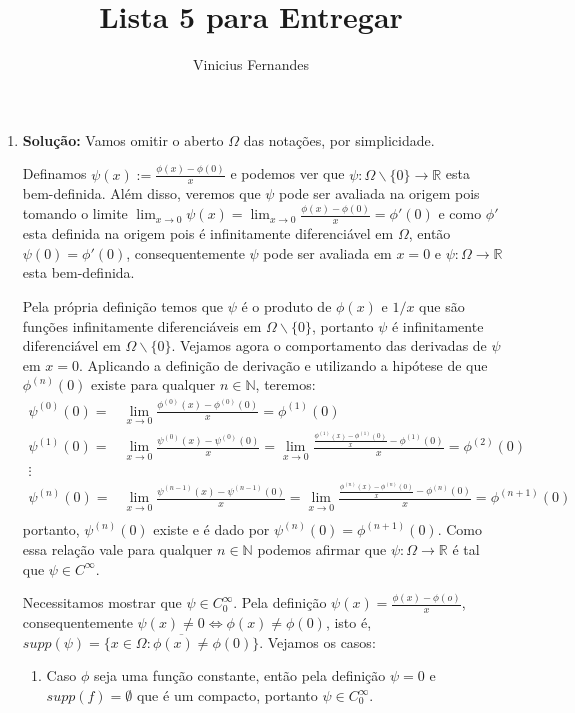 \documentclass{article}
\begin{document}
	
	\title{Lista 5 para Entregar}
	\author{Vinicius Fernandes}
	
	\maketitle
	
	\begin{enumerate}
		
		\item \textbf{Solução:} Vamos omitir o aberto $\Omega$ das notações, por simplicidade.
		
		Definamos $\psi(x) := \frac{\phi(x) - \phi(0)}{x}$ e podemos ver que $\psi:\Omega\backslash\{0\} \to \mathbb{R}$ esta bem-definida. Além disso, veremos que $\psi$ pode ser avaliada na origem pois tomando o limite $\lim_{x \to 0} \psi(x) = \lim_{x \to 0} \frac{\phi(x) - \phi(0)}{x} = \phi'(0)$ e como $\phi'$  esta definida na origem pois é infinitamente diferenciável em $\Omega$, então $\psi(0) = \phi'(0)$, consequentemente $\psi$ pode ser avaliada em $x=0$ e $\psi:\Omega \to \mathbb{R}$ esta bem-definida. 
		
		Pela própria definição temos que $\psi$ é o produto de $\phi(x)$ e $1/x$ que são funções infinitamente diferenciáveis em $\Omega \backslash\{0\}$, portanto $\psi$ é infinitamente diferenciável em $\Omega \backslash\{0\}$. Vejamos agora o comportamento das derivadas de $\psi$ em $x=0$. Aplicando a definição de derivação e utilizando a hipótese de que $\phi^{(n)}(0)$ existe para qualquer $n \in \mathbb{N}$, teremos:
		$$
		\begin{aligned}
		\psi^{(0)}(0) 
		= & \lim_{x \to 0}\frac{\phi^{(0)}(x) - \phi^{(0)}(0)}{x} = \phi^{(1)}(0) \\
		\psi^{(1)}(0) 
		= & \lim_{x \to 0}\frac{\psi^{(0)}(x) - \psi^{(0)}(0)}{x} = \lim_{x \to 0}\frac{\frac{\phi^{(1)}(x) - \phi^{(1)}(0)}{x} - \phi^{(1)}(0)}{x} = \phi^{(2)}(0) \\
		\vdots & \\
		\psi^{(n)}(0) 
		= & \lim_{x \to 0}\frac{\psi^{(n-1)}(x) - \psi^{(n-1)}(0)}{x} = \lim_{x \to 0}\frac{\frac{\phi^{(n)}(x) - \phi^{(n)}(0)}{x} - \phi^{(n)}(0)}{x} = \phi^{(n+1)}(0) \\
		\end{aligned}
		$$
		portanto, $\psi^{(n)}(0)$ existe e é dado por $\psi^{(n)}(0) = \phi^{(n+1)}(0)$. Como essa relação vale para qualquer $n \in \mathbb{N}$ podemos afirmar que $\psi:\Omega \to \mathbb{R}$ é tal que $\psi \in C^{\infty}$. 
		
		Necessitamos mostrar que $\psi \in C^{\infty}_{0}$. Pela definição $\psi(x) = \frac{\phi(x) - \phi(o)}{x}$, consequentemente $\psi(x) \neq 0 \iff \phi(x) \neq \phi(0)$, isto é, $supp(\psi) = \overline{ \{x \in \Omega: \phi(x) \neq \phi(0)\} }$. Vejamos os casos:
		\begin{enumerate}
			\item Caso $\phi$ seja uma função constante, então pela definição $\psi = 0$ e $supp(f) = \emptyset$ que é um compacto, portanto $\psi \in C^{\infty}_{0}$.
			

\end{enumerate}
\end{enumerate}
\end{document}
